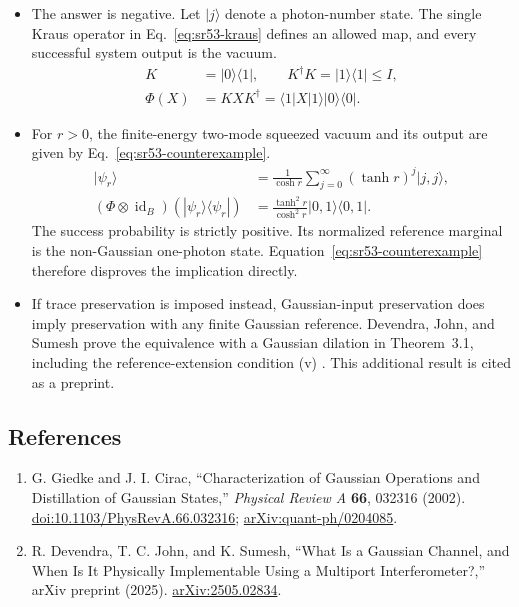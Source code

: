 \begin{itemize}
  \item The answer is negative. Let $|j\rangle$ denote a photon-number state. The single Kraus operator in Eq.~\eqref{eq:sr53-kraus} defines an allowed map, and every successful system output is the vacuum.
\begin{equation}
\begin{aligned}
 K&=|0\rangle\langle1|,\qquad K^\dagger K=|1\rangle\langle1|\leq I,\\
 \Phi(X)&=KXK^\dagger=\langle1|X|1\rangle|0\rangle\langle0|.
\end{aligned}
\label{eq:sr53-kraus}
\end{equation}

  \item For $r>0$, the finite-energy two-mode squeezed vacuum and its output are given by Eq.~\eqref{eq:sr53-counterexample}.
\begin{equation}
\begin{aligned}
 |\psi_r\rangle&=\frac1{\cosh r}\sum_{j=0}^\infty(\tanh r)^j|j,j\rangle,\\
 (\Phi\otimes\operatorname{id}_B)(|\psi_r\rangle\langle\psi_r|)
 &=\frac{\tanh^2 r}{\cosh^2 r}|0,1\rangle\langle0,1|.
\end{aligned}
\label{eq:sr53-counterexample}
\end{equation}
The success probability is strictly positive. Its normalized reference marginal is the non-Gaussian one-photon state. Equation~\eqref{eq:sr53-counterexample} therefore disproves the implication directly.

  \item If trace preservation is imposed instead, Gaussian-input preservation does imply preservation with any finite Gaussian reference. Devendra, John, and Sumesh prove the equivalence with a Gaussian dilation in Theorem~3.1, including the reference-extension condition (v) . This additional result is cited as a preprint.
\end{itemize}

\subsection*{References}

\begin{enumerate}[label={},leftmargin=4.8em,labelsep=0.5em]
  \footnotesize
  \item[\textup{[GC02]}]\label{ref:sr53-giedke}
  G. Giedke and J. I. Cirac, ``Characterization of Gaussian Operations and Distillation of Gaussian States,'' \emph{Physical Review A} \textbf{66}, 032316 (2002). \href{https://doi.org/10.1103/PhysRevA.66.032316}{doi:10.1103/PhysRevA.66.032316}; \href{https://arxiv.org/abs/quant-ph/0204085}{arXiv:quant-ph/0204085}.

  \item[\textup{[DJS25]}]\label{ref:sr53-devendra}
  R. Devendra, T. C. John, and K. Sumesh, ``What Is a Gaussian Channel, and When Is It Physically Implementable Using a Multiport Interferometer?,'' arXiv preprint (2025). \href{https://arxiv.org/abs/2505.02834}{arXiv:2505.02834}.
\end{enumerate}

